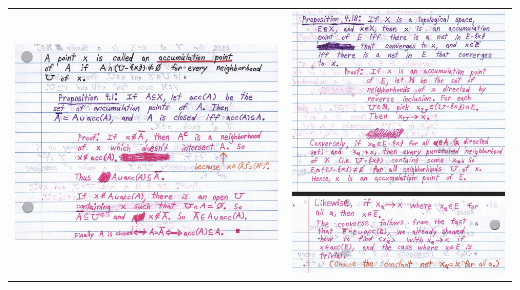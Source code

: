 \documentclass{book}
\newcommand{\retTwo}{\hfill\bigbreak}
\begin{document}
\hspace{-2em}\begin{tabular}{p{3.7in} p{3.7in}}
{\centering\includegraphics[scale=0.54]{HW2_1_math220a.png}\retTwo\par} & {\centering\includegraphics[scale=0.54]{HW2_2_math220a.png}\retTwo\par}
\end{tabular}\retTwo
\end{document}
